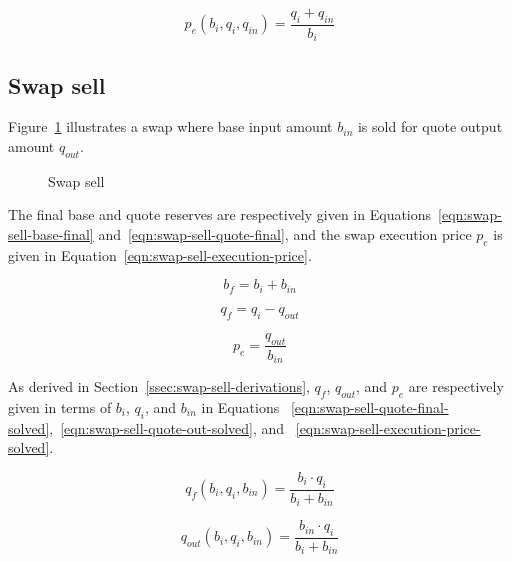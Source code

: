 \documentclass[table, twocolumn]{article}
\begin{document}
\begin{equation}\label{eqn:swap-buy-execution-price-solved}
	p_e (b_i, q_i, q_{in}) = \frac{q_i + q_{in}}{b_i}
\end{equation}

\subsection{Swap sell}\label{ssec:swap-sell}

Figure~\ref{fig:swap-sell} illustrates a swap where base input amount $b_{in}$ is sold
for quote output amount $q_{out}$.

\begin{figure}[!htb]
	\centering
	
	\caption{Swap sell}\label{fig:swap-sell}
\end{figure}

The final base and quote reserves are respectively given in
Equations~\ref{eqn:swap-sell-base-final} and~\ref{eqn:swap-sell-quote-final}, and the
swap execution price $p_e$ is given in Equation~\ref{eqn:swap-sell-execution-price}.

\begin{equation}\label{eqn:swap-sell-base-final}
	b_f = b_i + b_{in}
\end{equation}

\begin{equation}\label{eqn:swap-sell-quote-final}
	q_f = q_i - q_{out}
\end{equation}

\begin{equation}\label{eqn:swap-sell-execution-price}
	p_e = \frac{q_{out}}{b_{in}}
\end{equation}

As derived in Section~\ref{ssec:swap-sell-derivations}, $q_f$, $q_{out}$, and $p_e$ are
respectively given in terms of $b_i$, $q_i$, and $b_{in}$ in Equations%
~\ref{eqn:swap-sell-quote-final-solved},~\ref{eqn:swap-sell-quote-out-solved}, and%
~\ref{eqn:swap-sell-execution-price-solved}.

\begin{equation}\label{eqn:swap-sell-quote-final-solved}
	q_f(b_i, q_i, b_{in}) = \frac{b_i \cdot q_i}{b_i + b_{in}}
\end{equation}

\begin{equation}\label{eqn:swap-sell-quote-out-solved}
	q_{out} (b_i, q_i, b_{in}) = \frac{b_{in} \cdot q_i}{b_i + b_{in}}
\end{equation}
\end{document}
